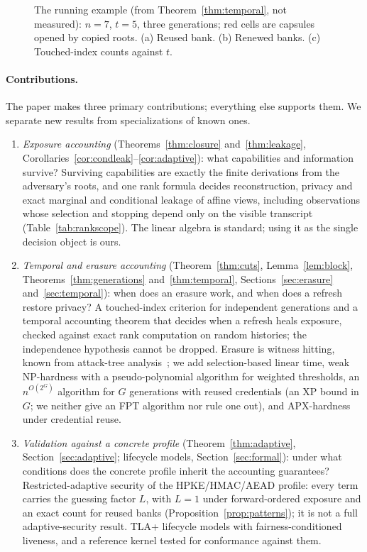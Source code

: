 \documentclass[pdflatex,sn-mathphys-num]{sn-jnl}%
\theoremstyle{plain}
\theoremstyle{definition}
\begin{document}
\begin{figure}[t]
\centering
\figbox{}
\caption{The running example (from Theorem~\ref{thm:temporal}, not measured): $n=7$, $t=5$, three generations; red cells are capsules opened by copied roots. (a) Reused bank. (b) Renewed banks. (c) Touched-index counts against $t$.}\label{fig:worked}
\end{figure}

\paragraph{Contributions.}
The paper makes three primary contributions; everything else supports them. We separate new results from specializations of known ones.
\begin{enumerate}
\item \emph{Exposure accounting} (Theorems~\ref{thm:closure} and~\ref{thm:leakage}, Corollaries~\ref{cor:condleak}--\ref{cor:adaptive}): what capabilities and information survive? Surviving capabilities are exactly the finite derivations from the adversary's roots, and one rank formula decides reconstruction, privacy and exact marginal and conditional leakage of affine views, including observations whose selection and stopping depend only on the visible transcript (Table~\ref{tab:rankscope}). The linear algebra is standard; using it as the single decision object is ours.
\item \emph{Temporal and erasure accounting} (Theorem~\ref{thm:cuts}, Lemma~\ref{lem:block}, Theorems~\ref{thm:generations} and~\ref{thm:temporal}, Sections~\ref{sec:erasure} and~\ref{sec:temporal}): when does an erasure work, and when does a refresh restore privacy? A touched-index criterion for independent generations and a temporal accounting theorem that decides when a refresh heals exposure, checked against exact rank computation on random histories; the independence hypothesis cannot be dropped. Erasure is witness hitting, known from attack-tree analysis~\cite{mauw2005,lopuhaa2022}; we add selection-based linear time, weak NP-hardness with a pseudo-polynomial algorithm for weighted thresholds, an $n^{O(2^G)}$ algorithm for $G$ generations with reused credentials (an XP bound in $G$; we neither give an FPT algorithm nor rule one out), and APX-hardness under credential reuse.
\item \emph{Validation against a concrete profile} (Theorem~\ref{thm:adaptive}, Section~\ref{sec:adaptive}; lifecycle models, Section~\ref{sec:formal}): under what conditions does the concrete profile inherit the accounting guarantees? Restricted-adaptive security of the HPKE/HMAC/AEAD profile: every term carries the guessing factor $L$, with $L=1$ under forward-ordered exposure and an exact count for reused banks (Proposition~\ref{prop:patterns}); it is not a full adaptive-security result. TLA+ lifecycle models with fairness-conditioned liveness, and a reference kernel tested for conformance against them.
\end{enumerate}
\end{document}

